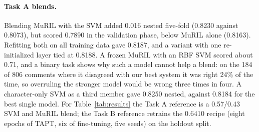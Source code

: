 \documentclass[11pt]{article}
\newcommand{\taska}{Task A}
\newcommand{\taskb}{Task B}
\begin{document}
\paragraph{\taska{} blends.} Blending MuRIL with the SVM added 0.016 nested five-fold
(0.8230 against 0.8073), but scored 0.7890 in the validation phase, below MuRIL
alone (0.8163). Refitting both on all training data gave 0.8187, and a variant
with one re-initialized layer tied at 0.8188. A frozen MuRIL with an RBF SVM
scored about 0.71, and a binary task shows why such a model cannot help a blend:
on the 184 of 806 comments where it disagreed with our best system it was right
24\% of the time, so overruling the stronger model would be wrong three times in
four. A character-only SVM as a third member gave 0.8250 nested, against 0.8184
for the best single model. For Table~\ref{tab:results} the \taska{} reference is
a 0.57/0.43 SVM and MuRIL blend; the \taskb{} reference retrains the 0.6410
recipe (eight epochs of TAPT, six of fine-tuning, five seeds) on the holdout
split.
\end{document}
